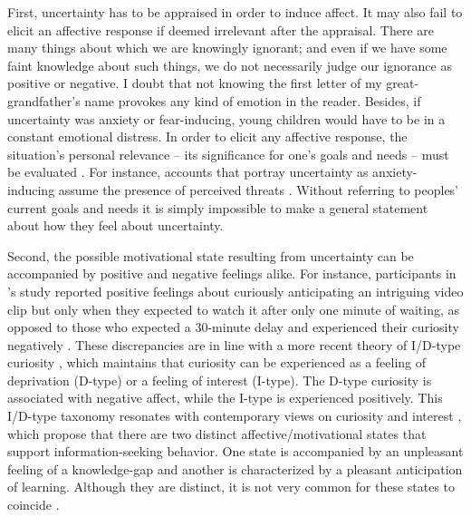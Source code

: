 First, uncertainty has to be appraised in order to induce affect. It may also fail to elicit an affective response if deemed irrelevant after the appraisal. There are many things about which we are knowingly ignorant; and even if we have some faint knowledge about such things, we do not necessarily judge our ignorance as positive or negative. I doubt that not knowing the first letter of my great-grandfather's name provokes any kind of emotion in the reader. Besides, if uncertainty was anxiety or fear-inducing, young children would have to be in a constant emotional distress. In order to elicit any affective response, the situation's personal relevance -- its significance for one's goals and needs -- must be evaluated \parencite{lazarus_progress_1991,cunningham_motivational_2012}. For instance, accounts that portray uncertainty as anxiety-inducing assume the presence of perceived threats \parencite{grupe_uncertainty_2013}. Without referring to peoples' current goals and needs it is simply impossible to make a general statement about how they feel about uncertainty.

Second, the possible motivational state resulting from uncertainty can be accompanied by positive and negative feelings alike. For instance, participants in \citeauthor{noordewier_curiosity_2017}'s \citeyearpar{noordewier_curiosity_2017} study reported positive feelings about curiously anticipating an intriguing video clip but only when they expected to watch it after only one minute of waiting, as opposed to those who expected a 30-minute delay and experienced their curiosity negatively \parencite[but see][]{van_lieshout_curiosity_2020}. These discrepancies are in line with a more recent theory of I/D-type curiosity \parencite{litman_curiosity_2019}, which maintains that curiosity can be experienced as a feeling of deprivation (D-type) or a feeling of interest (I-type). The D-type curiosity is associated with negative affect, while the I-type is experienced positively. This I/D-type taxonomy resonates with contemporary views on curiosity and interest \parencite[e.g., ][]{hidi_interest_2019,shin_homo_2019,murayama_process_2019}, which propose that there are two distinct affective/motivational states that support information-seeking behavior. One state is accompanied by an unpleasant feeling of a knowledge-gap and another is characterized by a pleasant anticipation of learning. Although they are distinct, it is not very common for these states to coincide \parencite{hidi_interest_2019}.

